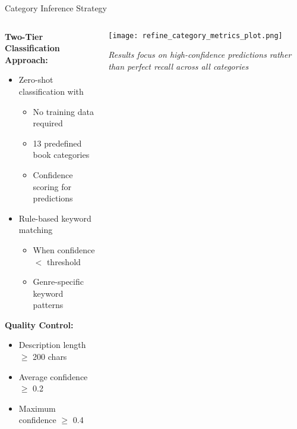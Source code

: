 \begin{frame}{Category Inference Strategy}

\begin{columns}[T]
  \begin{column}{0.50\textwidth}
    \textbf{Two-Tier Classification Approach:}
    \begin{itemize}
      \item {} Zero-shot classification with 
        \begin{itemize}
          \item No training data required
          \item 13 predefined book categories
          \item Confidence scoring for predictions
        \end{itemize}
      \item {} Rule-based keyword matching
        \begin{itemize}
          \item When confidence $<$ threshold
          \item Genre-specific keyword patterns
        \end{itemize}
    \end{itemize}

    \vspace{0.3cm}
    \textbf{Quality Control:}
    \begin{itemize}
      \item Description length $\geq$ 200 chars
      \item Average confidence $\geq$ 0.2
      \item Maximum confidence $\geq$ 0.4
    \end{itemize}
  \end{column}

  \begin{column}{0.45\textwidth}
    \centering
    \texttt{[image: refine\_category\_metrics\_plot.png]}
    
    \vspace{0.1cm}
    \tiny \textit{Results focus on high-confidence predictions rather than perfect recall across all categories}
  \end{column}
\end{columns}

\end{frame}

